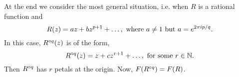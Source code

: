 \noindent At the end we consider the most general situation, i.e. when \( R \)
is a rational function and
\[
	R(z)=az+bz^{p+1}+\ldots,\text{ where \( a\neq 1 \) but \( a=e^{2 \pi i p/q} \)}
.\]  
In this case, \( \ror[q](z) \) is of the form, \[
	\ror[q](z)=z+cz^{r+1}+\ldots,\text{ for some } r \in \mathbb{N}
.\] 
Then \( \ror[q] \) has \( r \) petals at the origin. Now, \( F(\ror[q])=F(R) \).

